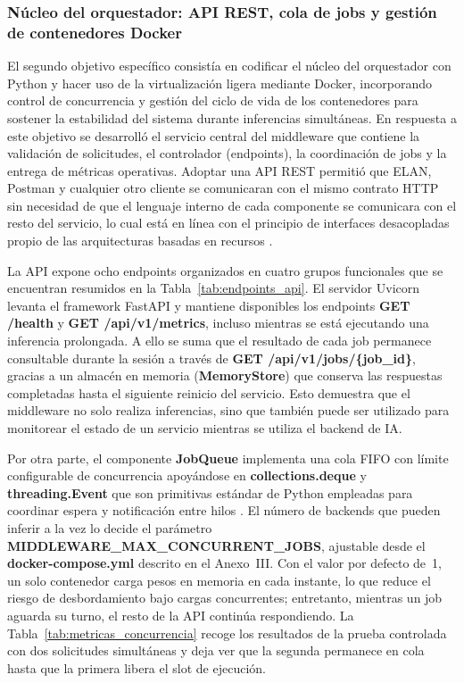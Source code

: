 \documentclass[11pt,a4paper]{article}
\begin{document}
\subsubsection{Núcleo del orquestador: API REST, cola de jobs y gestión de contenedores Docker}

El segundo objetivo específico consistía en codificar el núcleo del orquestador con Python y hacer uso de la virtualización ligera mediante Docker, incorporando control de concurrencia y gestión del ciclo de vida de los contenedores para sostener la estabilidad del sistema durante inferencias simultáneas. En respuesta a este objetivo se desarrolló el servicio central del middleware que contiene la validación de solicitudes, el controlador (endpoints), la coordinación de jobs y la entrega de métricas operativas. Adoptar una API REST permitió que ELAN, Postman y cualquier otro cliente se comunicaran con el mismo contrato HTTP sin necesidad de que el lenguaje interno de cada componente se comunicara con el resto del servicio, lo cual está en línea con el principio de interfaces desacopladas propio de las arquitecturas basadas en recursos \cite{fielding2000rest,fastapi2026features}.

La API expone ocho endpoints organizados en cuatro grupos funcionales que se encuentran resumidos en la Tabla~\ref{tab:endpoints_api}. El servidor Uvicorn levanta el framework FastAPI y mantiene disponibles los endpoints \textbf{GET /health} y \textbf{GET /api/v1/metrics}, incluso mientras se está ejecutando una inferencia prolongada. A ello se suma que el resultado de cada job permanece consultable durante la sesión a través de \textbf{GET /api/v1/jobs/\{job\_id\}}, gracias a un almacén en memoria (\textbf{MemoryStore}) que conserva las respuestas completadas hasta el siguiente reinicio del servicio. Esto demuestra que el middleware no solo realiza inferencias, sino que también puede ser utilizado para monitorear el estado de un servicio mientras se utiliza el backend de IA.

Por otra parte, el componente \textbf{JobQueue} implementa una cola FIFO con límite configurable de concurrencia apoyándose en \textbf{collections.deque} y \textbf{threading.Event} que son primitivas estándar de Python empleadas para coordinar espera y notificación entre hilos \cite{python_threading}. El número de backends que pueden inferir a la vez lo decide el parámetro \textbf{MIDDLEWARE\_\allowbreak{}MAX\_\allowbreak{}CONCURRENT\_\allowbreak{}JOBS}, ajustable desde el \textbf{docker-compose.yml} descrito en el Anexo~III. Con el valor por defecto de~1, un solo contenedor carga pesos en memoria en cada instante, lo que reduce el riesgo de desbordamiento bajo cargas concurrentes; entretanto, mientras un job aguarda su turno, el resto de la API continúa respondiendo. La Tabla~\ref{tab:metricas_concurrencia} recoge los resultados de la prueba controlada con dos solicitudes simultáneas y deja ver que la segunda permanece en cola hasta que la primera libera el slot de ejecución.
\end{document}
